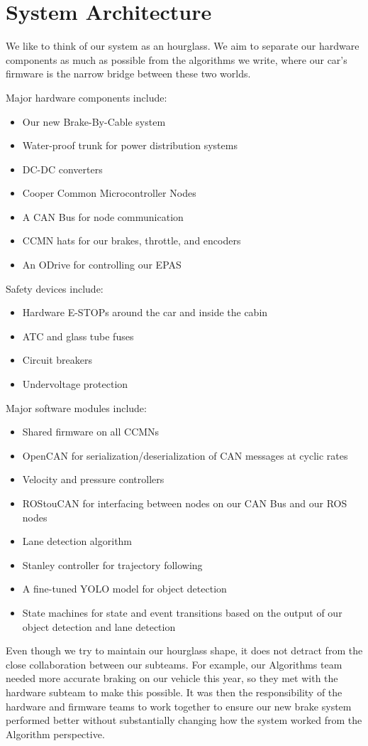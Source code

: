 \section{System Architecture}

We like to think of our system as an hourglass. We aim to separate our
hardware components as much as possible from the algorithms we write,
where our car's firmware is the narrow bridge between these two worlds.

\vspace{1em}

Major hardware components include:
\begin{itemize}
  \item Our new Brake-By-Cable system
  \item Water-proof trunk for power distribution systems
  \item DC-DC converters
  \item Cooper Common Microcontroller Nodes
  \item A CAN Bus for node communication
  \item CCMN hats for our brakes, throttle, and encoders
  \item An ODrive for controlling our EPAS
\end{itemize}

Safety devices include:
\begin{itemize}
  \item Hardware E-STOPs around the car and inside the cabin
  \item ATC and glass tube fuses
  \item Circuit breakers
  \item Undervoltage protection
\end{itemize}

Major software modules include:
\begin{itemize}
  \item Shared firmware on all CCMNs
  \item OpenCAN for serialization/deserialization of CAN messages at cyclic
        rates
  \item Velocity and pressure controllers
  \item ROStouCAN for interfacing between nodes on our CAN Bus and our ROS
        nodes
  \item Lane detection algorithm
  \item Stanley controller for trajectory following
  \item A fine-tuned YOLO model for object detection
  \item State machines for state and event transitions based on the output of
        our object detection and lane detection
\end{itemize}

Even though we try to maintain our hourglass shape, it does not detract
from the close collaboration between our subteams. For example, our
Algorithms team needed more accurate braking on our vehicle this year,
so they met with the hardware subteam to make this possible. It was
then the responsibility of the hardware and firmware teams to work
together to ensure our new brake system performed better without
substantially changing how the system worked from the Algorithm
perspective.
